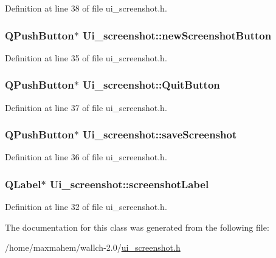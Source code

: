 Definition at line 38 of file ui\_\-screenshot.h.

\hypertarget{classUi__screenshot_a1968e684c0abd18197e33de63bbf597d}{
\subsubsection[{newScreenshotButton}]{\setlength{\rightskip}{0pt plus 5cm}QPushButton$\ast$ {\bf Ui\_\-screenshot::newScreenshotButton}}}
\label{classUi__screenshot_a1968e684c0abd18197e33de63bbf597d}


Definition at line 35 of file ui\_\-screenshot.h.

\hypertarget{classUi__screenshot_a0147ccabb2901f567d2524bd495315da}{
\subsubsection[{QuitButton}]{\setlength{\rightskip}{0pt plus 5cm}QPushButton$\ast$ {\bf Ui\_\-screenshot::QuitButton}}}
\label{classUi__screenshot_a0147ccabb2901f567d2524bd495315da}


Definition at line 37 of file ui\_\-screenshot.h.

\hypertarget{classUi__screenshot_afb9c97a8b8838d3459b2fe7741bce4a3}{
\subsubsection[{saveScreenshot}]{\setlength{\rightskip}{0pt plus 5cm}QPushButton$\ast$ {\bf Ui\_\-screenshot::saveScreenshot}}}
\label{classUi__screenshot_afb9c97a8b8838d3459b2fe7741bce4a3}


Definition at line 36 of file ui\_\-screenshot.h.

\hypertarget{classUi__screenshot_aa935229caf3a6831fd0b9e9372882f9e}{
\subsubsection[{screenshotLabel}]{\setlength{\rightskip}{0pt plus 5cm}QLabel$\ast$ {\bf Ui\_\-screenshot::screenshotLabel}}}
\label{classUi__screenshot_aa935229caf3a6831fd0b9e9372882f9e}


Definition at line 32 of file ui\_\-screenshot.h.



The documentation for this class was generated from the following file:\begin{DoxyCompactItemize}
\item 
/home/maxmahem/wallch-\/2.0/\hyperlink{ui__screenshot_8h}{ui\_\-screenshot.h}\end{DoxyCompactItemize}

